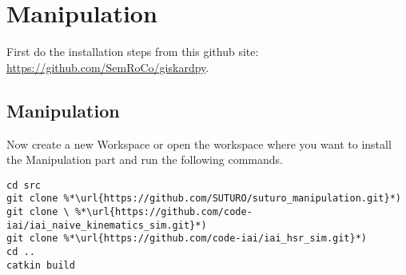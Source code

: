 \documentclass[main.tex]{subfiles}
\begin{document}
\section{Manipulation}

First do the installation steps from this github site:\\
	\url{https://github.com/SemRoCo/giskardpy}.\\
	
	\subsection{Manipulation}
Now create a new Workspace or open the workspace where you want to install the Manipulation part and run the following commands.	
\begin{lstlisting}
cd src
git clone %*\url{https://github.com/SUTURO/suturo_manipulation.git}*)
git clone \ %*\url{https://github.com/code-iai/iai_naive_kinematics_sim.git}*)
git clone %*\url{https://github.com/code-iai/iai_hsr_sim.git}*)
cd ..
catkin build  
\end{lstlisting}
	
	
\end{document}
